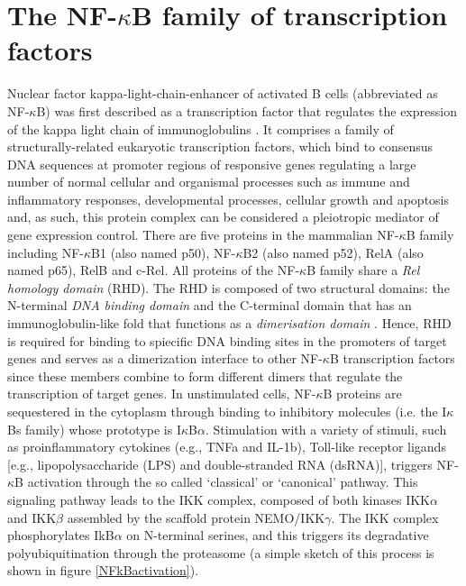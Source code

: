 \documentclass[12pt,a4paper]{report}
\begin{document}
\chapter{The NF-$\kappa$B family of transcription factors}
Nuclear factor kappa-light-chain-enhancer of activated B cells (abbreviated as NF-$\kappa$B) was first described as a transcription factor that regulates the expression of the kappa light chain of immunoglobulins \cite{YoutubeNFkB}.  It comprises a family of structurally-related eukaryotic transcription factors, which bind to consensus DNA sequences at promoter regions of responsive genes regulating a large number of normal cellular and organismal processes such as immune and inflammatory responses, developmental processes, cellular growth and apoptosis and, as such, this protein complex can be considered a pleiotropic mediator of gene expression control. There are five proteins in the mammalian NF-$\kappa$B family including NF-$\kappa$B1 (also named p50), NF-$\kappa$B2 (also named p52), RelA (also named p65), RelB and c-Rel. All proteins of the NF-$\kappa$B family share a \emph{Rel homology domain} (RHD). The RHD is composed of two structural domains: the N-terminal \emph{DNA binding domain} and the C-terminal domain that has an immunoglobulin-like fold that functions as a \emph{dimerisation domain} \cite{domain}. Hence, RHD is required for binding to spiecific DNA binding sites in the promoters of target genes and serves as a dimerization interface to other NF-$\kappa$B transcription factors since these members combine to form different dimers that regulate the transcription of target genes. %
\newline
In unstimulated cells, NF-$\kappa$B proteins are sequestered in the cytoplasm through binding to inhibitory molecules (i.e. the I$\kappa$Bs family) whose prototype is I$\kappa$B$\alpha$. Stimulation with a variety of stimuli, such as proinflammatory cytokines (e.g., TNFa and IL-1b), Toll-like receptor ligands [e.g., lipopolysaccharide (LPS) and double-stranded RNA (dsRNA)], triggers NF-$\kappa$B activation through the so called ‘classical’ or ‘canonical’ pathway. This signaling pathway leads to the IKK complex, composed of both kinases IKK$\alpha$ and IKK$\beta$ assembled by the scaffold protein NEMO/IKK$\gamma$. The IKK complex phosphorylates IkB$\alpha$ on N-terminal serines, and this triggers its degradative polyubiquitination through the proteasome (a simple sketch of this process is shown in figure \ref{NFkBactivation}). 
\end{document}
